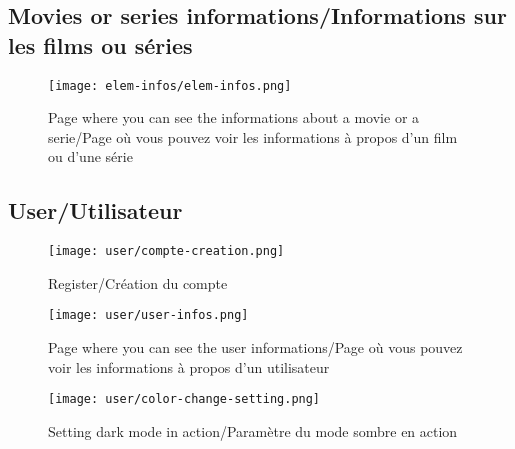 \pagebreak

\subsection{Movies or series informations/Informations sur les films ou séries}

\begin{figure}
    \centering
    \texttt{[image: elem-infos/elem-infos.png]}
    \caption{Page where you can see the informations about a movie or a serie/Page où vous pouvez voir les informations à propos d'un film ou d'une série}
    \label{fig:elem-infos}
\end{figure}

\pagebreak

\subsection{User/Utilisateur}

\begin{figure}
    \centering
    \texttt{[image: user/compte-creation.png]}
    \caption{Register/Création du compte}
    \label{fig:register}
\end{figure}

\begin{figure}
    \centering
    \texttt{[image: user/user-infos.png]}
    \caption{Page where you can see the user informations/Page où vous pouvez voir les informations à propos d'un utilisateur}
    \label{fig:user-infos}
\end{figure}

\begin{figure}
    \centering
    \texttt{[image: user/color-change-setting.png]}
    \caption{Setting dark mode in action/Paramètre du mode sombre en action}
    \label{fig:color-change-setting}
\end{figure}

